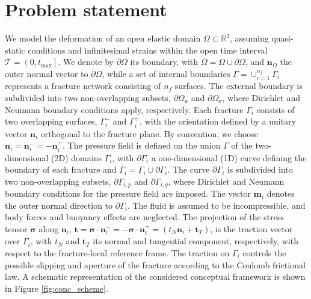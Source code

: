 \documentclass[3p,times]{elsarticle}
\theoremstyle{plain}
\renewcommand{\vec}[1]{\boldsymbol{#1}}
\newcommand{\tensorTwo}[1]{\boldsymbol#1}
\begin{document}
\section{Problem statement}
\label{sec:gen_fram}

We model the deformation of an open elastic domain $\Omega \subset \mathbb{R}^3$, assuming
quasi-static conditions and infinitesimal strains within the open time interval $\mathcal{T}=\left(0,t_{\max}\right]$. We denote by $\partial \Omega$ its boundary, with $\overline{\Omega}=\Omega\cup\partial\Omega$, 
and $\vec{n}_{\Omega}$ the outer normal vector to $\partial \Omega$, while a set of internal boundaries $\Gamma
= \cup_{i=1}^{n_f} \Gamma_i$ represents a fracture network consisting of $n_f$ surfaces. The
external boundary is subdivided into two
non-overlapping subsets, $\partial\Omega_u$ and $\partial\Omega_{\sigma}$, where Dirichlet and Neumann boundary conditions
apply, respectively. Each fracture $\Gamma_i$ consists of two overlapping surfaces,
$\Gamma_i^-$ and $\Gamma_i^+$, with the orientation defined by a unitary vector $\vec{n}_i$
orthogonal to the fracture plane. By convention, we choose $\vec{n}_i =
\vec{n}_i^- = -\vec{n}_i^+$. The pressure field is
defined on the union $\Gamma$ of the two-dimensional (2D) domains $\Gamma_i$, 
%
with $\partial \Gamma_i$ a one-dimensional (1D) curve defining the boundary of each fracture and $\overline{\Gamma}_i=\Gamma_i\cup\partial\Gamma_i$. The curve $\partial\Gamma_i$
is subdivided into two non-overlapping subsets, $\partial \Gamma_{i,p}$ and $\partial
\Gamma_{i,q}$, where Dirichlet and Neumann boundary conditions for the pressure
field are imposed. The vector $\vec{m}_i$ denotes the outer normal direction to
$\partial \Gamma_i$. The fluid is assumed to be incompressible, and body forces and
buoyancy effects are neglected.
The projection of the stress tensor $\tensorTwo{\sigma}$ along $\vec{n}_i$, 
$\vec{t} = \tensorTwo{\sigma} \cdot \vec{n}_i^- = -
\tensorTwo{\sigma} \cdot \vec{n}_i^+ = (t_N \vec{n}_i + \vec{t}_T)$, is the traction vector
over $\Gamma_i$, with $t_N$ and $\vec{t}_T$ %
its
normal and tangential component, respectively, with respect to the fracture-local reference frame.
The traction on $\Gamma_i$ controls the possible slipping and aperture of the fracture according to the Coulomb frictional law. A schematic representation of the considered conceptual framework is shown in Figure \ref{fig:conc_scheme}.
\end{document}
